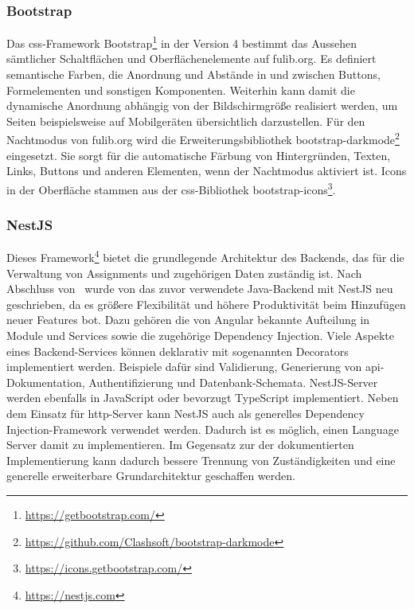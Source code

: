 \subsubsection{Bootstrap}
Das \ac{css}-Framework Bootstrap\footnote{\url{https://getbootstrap.com/}} in der Version 4 bestimmt das Aussehen sämtlicher Schaltflächen und Oberflächenelemente auf fulib.org.
Es definiert semantische Farben, die Anordnung und Abstände in und zwischen Buttons, Formelementen und sonstigen Komponenten.
Weiterhin kann damit die dynamische Anordnung abhängig von der Bildschirmgröße realisiert werden, um Seiten beispielsweise auf Mobilgeräten übersichtlich darzustellen.
Für den Nachtmodus von fulib.org wird die Erweiterungsbibliothek bootstrap-darkmode\footnote{\url{https://github.com/Clashsoft/bootstrap-darkmode}} eingesetzt.
Sie sorgt für die automatische Färbung von Hintergründen, Texten, Links, Buttons und anderen Elementen, wenn der Nachtmodus aktiviert ist.
Icons in der Oberfläche stammen aus der \ac{css}-Bibliothek bootstrap-icons\footnote{\url{https://icons.getbootstrap.com/}}.

\subsubsection{NestJS}
Dieses Framework\footnote{\url{https://nestjs.com}} bietet die grundlegende Architektur des Backends, das für die Verwaltung von Assignments und zugehörigen Daten zuständig ist.
Nach Abschluss von~\cite{bachelor-thesis} wurde von das zuvor verwendete Java-Backend mit NestJS neu geschrieben, da es größere Flexibilität und höhere Produktivität beim Hinzufügen neuer Features bot.
Dazu gehören die von Angular bekannte Aufteilung in Module und Services sowie die zugehörige Dependency Injection.
Viele Aspekte eines Backend-Services können deklarativ mit sogenannten Decorators implementiert werden.
Beispiele dafür sind Validierung, Generierung von \ac{api}-Dokumentation, Authentifizierung und Datenbank-Schemata.
NestJS-Server werden ebenfalls in JavaScript oder bevorzugt TypeScript implementiert.
Neben dem Einsatz für \ac{http}-Server kann NestJS auch als generelles Dependency Injection-Framework verwendet werden.
Dadurch ist es möglich, einen Language Server damit zu implementieren.
Im Gegensatz zur der dokumentierten\cite{vsc-language-server-guide} Implementierung kann dadurch bessere Trennung von Zuständigkeiten und eine generelle erweiterbare Grundarchitektur geschaffen werden.
